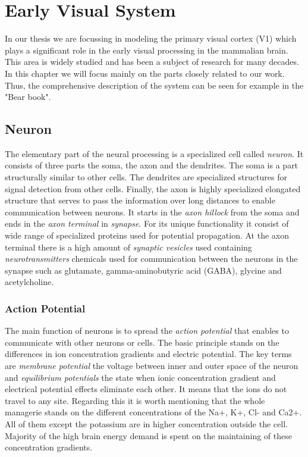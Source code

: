 \chapter{Early Visual System}
\label{chap:visual_system}
In our thesis we are focussing in modeling the primary visual cortex (V1)
which plays a significant role in the early visual processing in the
mammalian brain. This area is widely studied and has been a subject of
research for many decades. In this chapter we will focus mainly on the 
parts closely related to our work. Thus, the comprehensive description
of the system can be seen for example in the "Bear book". 

\section{Neuron}
\label{sec:neuron}
The elementary part of the neural processing is a specialized cell called \emph{neuron}.
It consists of three parts the soma, the axon and the dendrites. The soma is a
part structurally similar to other cells. The dendrites are specialized structures
for signal detection from other cells. Finally, the axon is highly specialized
elongated structure that serves to pass the information over long distances 
to enable communication between neurons. It starts in the \emph{axon hillock}
from the soma and ends in the \emph{axon terminal} in \emph{synapse}. For its 
unique functionality it consist of wide range of specialized proteins used for 
potential propagation. At the axon terminal there is a high amount of 
\emph{synaptic vesicles} used containing \emph{neurotransmitters} chemicals
used for communication between the neurons in the synapse such as 
glutamate, gamma-aminobutyric acid (GABA), glycine and acetylcholine.

\subsection{Action Potential}
\label{subsec:action_potential}
The main function of neurons is to spread the \emph{action potential} that enables to 
communicate with other neurons or cells. The basic principle stands on the 
differences in ion concentration gradients and electric potential. The key 
terms are \emph{membrane potential} the voltage between inner and outer space 
of the neuron and \emph{equilibrium potentials} the state when ionic concentration
gradient and electrical potential effects eliminate each other. It means that the
ions do not travel to any site. Regarding this it is worth mentioning that the whole
managerie stands on the different concentrations of the Na+, K+, Cl- and Ca2+. All of them
except the potassium are in higher concentration outside the cell. Majority of the 
high brain energy demand is spent on the maintaining of these concentration gradients.

